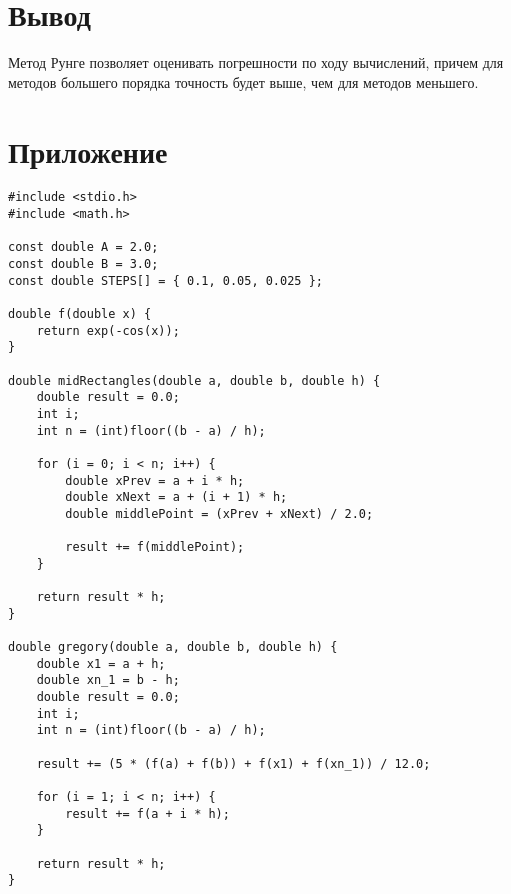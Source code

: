 \documentclass[12pt,a4paper]{article}
\begin{document}
\newpage    
    
    \section*{Вывод}
        Метод Рунге позволяет оценивать погрешности по ходу вычислений, причем для 
        методов большего порядка точность будет выше, чем для методов меньшего.
    
    \section*{Приложение}
        \begin{lstlisting}
#include <stdio.h>
#include <math.h>

const double A = 2.0;
const double B = 3.0;
const double STEPS[] = { 0.1, 0.05, 0.025 };

double f(double x) {
    return exp(-cos(x));
}

double midRectangles(double a, double b, double h) {
    double result = 0.0;
    int i;
    int n = (int)floor((b - a) / h);

    for (i = 0; i < n; i++) {
        double xPrev = a + i * h;
        double xNext = a + (i + 1) * h;
        double middlePoint = (xPrev + xNext) / 2.0;

        result += f(middlePoint);
    }

    return result * h;
}

double gregory(double a, double b, double h) {
    double x1 = a + h;
    double xn_1 = b - h;
    double result = 0.0;
    int i;
    int n = (int)floor((b - a) / h);

    result += (5 * (f(a) + f(b)) + f(x1) + f(xn_1)) / 12.0;
    
    for (i = 1; i < n; i++) {
        result += f(a + i * h);
    }

    return result * h;
}
        \end{lstlisting}
        
\end{document}
